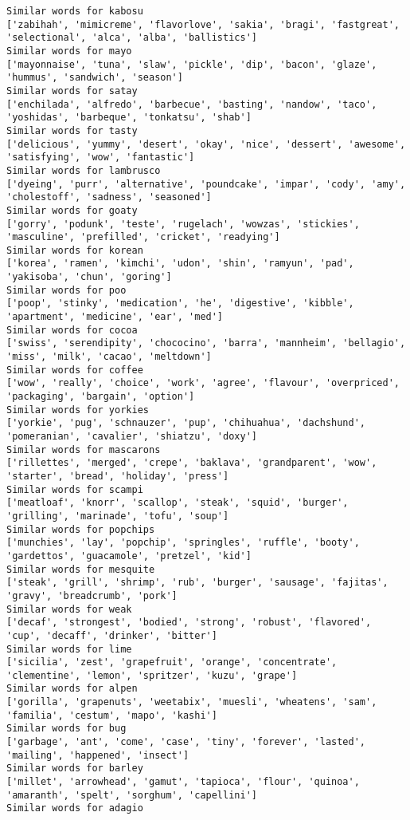 \documentclass[11pt]{article}
\begin{document}
\begin{Verbatim}[commandchars=\\\{\}]
Similar words for kabosu
['zabihah', 'mimicreme', 'flavorlove', 'sakia', 'bragi', 'fastgreat', 'selectional', 'alca', 'alba', 'ballistics']
Similar words for mayo
['mayonnaise', 'tuna', 'slaw', 'pickle', 'dip', 'bacon', 'glaze', 'hummus', 'sandwich', 'season']
Similar words for satay
['enchilada', 'alfredo', 'barbecue', 'basting', 'nandow', 'taco', 'yoshidas', 'barbeque', 'tonkatsu', 'shab']
Similar words for tasty
['delicious', 'yummy', 'desert', 'okay', 'nice', 'dessert', 'awesome', 'satisfying', 'wow', 'fantastic']
Similar words for lambrusco
['dyeing', 'purr', 'alternative', 'poundcake', 'impar', 'cody', 'amy', 'cholestoff', 'sadness', 'seasoned']
Similar words for goaty
['gorry', 'podunk', 'teste', 'rugelach', 'wowzas', 'stickies', 'masculine', 'prefilled', 'cricket', 'readying']
Similar words for korean
['korea', 'ramen', 'kimchi', 'udon', 'shin', 'ramyun', 'pad', 'yakisoba', 'chun', 'goring']
Similar words for poo
['poop', 'stinky', 'medication', 'he', 'digestive', 'kibble', 'apartment', 'medicine', 'ear', 'med']
Similar words for cocoa
['swiss', 'serendipity', 'chococino', 'barra', 'mannheim', 'bellagio', 'miss', 'milk', 'cacao', 'meltdown']
Similar words for coffee
['wow', 'really', 'choice', 'work', 'agree', 'flavour', 'overpriced', 'packaging', 'bargain', 'option']
Similar words for yorkies
['yorkie', 'pug', 'schnauzer', 'pup', 'chihuahua', 'dachshund', 'pomeranian', 'cavalier', 'shiatzu', 'doxy']
Similar words for mascarons
['rillettes', 'merged', 'crepe', 'baklava', 'grandparent', 'wow', 'starter', 'bread', 'holiday', 'press']
Similar words for scampi
['meatloaf', 'knorr', 'scallop', 'steak', 'squid', 'burger', 'grilling', 'marinade', 'tofu', 'soup']
Similar words for popchips
['munchies', 'lay', 'popchip', 'springles', 'ruffle', 'booty', 'gardettos', 'guacamole', 'pretzel', 'kid']
Similar words for mesquite
['steak', 'grill', 'shrimp', 'rub', 'burger', 'sausage', 'fajitas', 'gravy', 'breadcrumb', 'pork']
Similar words for weak
['decaf', 'strongest', 'bodied', 'strong', 'robust', 'flavored', 'cup', 'decaff', 'drinker', 'bitter']
Similar words for lime
['sicilia', 'zest', 'grapefruit', 'orange', 'concentrate', 'clementine', 'lemon', 'spritzer', 'kuzu', 'grape']
Similar words for alpen
['gorilla', 'grapenuts', 'weetabix', 'muesli', 'wheatens', 'sam', 'familia', 'cestum', 'mapo', 'kashi']
Similar words for bug
['garbage', 'ant', 'come', 'case', 'tiny', 'forever', 'lasted', 'mailing', 'happened', 'insect']
Similar words for barley
['millet', 'arrowhead', 'gamut', 'tapioca', 'flour', 'quinoa', 'amaranth', 'spelt', 'sorghum', 'capellini']
Similar words for adagio

\end{Verbatim}
\end{document}

